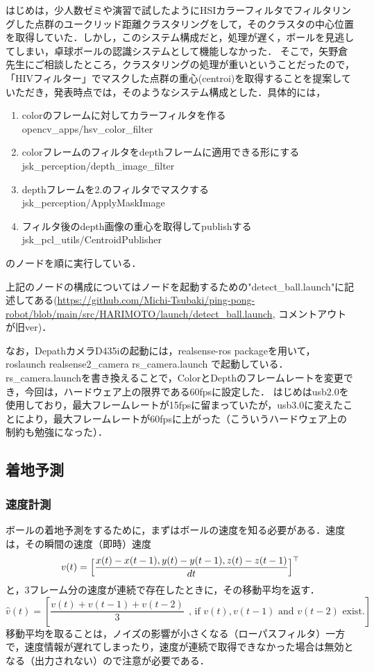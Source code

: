 \documentclass[10pt, oneside, titlepage]{ltjarticle}  %
\begin{document}
  はじめは，少人数ゼミや演習で試したようにHSIカラーフィルタでフィルタリングした点群のユークリッド距離クラスタリングをして，そのクラスタの中心位置を取得していた\cite{detect2}．しかし，このシステム構成だと，処理が遅く，ボールを見逃してしまい，卓球ボールの認識システムとして機能しなかった．
  そこで，矢野倉先生にご相談したところ，クラスタリングの処理が重いということだったので，「HIVフィルター」でマスクした点群の重心(centroi)を取得することを提案していただき\cite{detect1}，発表時点では，そのようなシステム構成とした．具体的には，
  \begin{enumerate}
  \item colorのフレームに対してカラーフィルタを作る \\
  opencv\_apps/hsv\_color\_filter
  \item colorフレームのフィルタをdepthフレームに適用できる形にする \\
  jsk\_perception/depth\_image\_filter
  \item depthフレームを2.のフィルタでマスクする \\
  jsk\_perception/ApplyMaskImage
  \item フィルタ後のdepth画像の重心を取得してpublishする \\
  jsk\_pcl\_utils/CentroidPublisher
  \end{enumerate}
  のノードを順に実行している．

  上記のノードの構成についてはノードを起動するための"detect\_ball.launch"に記述してある(\url{https://github.com/Michi-Tsubaki/ping-pong-robot/blob/main/src/HARIMOTO/launch/detect_ball.launch}, コメントアウトが旧ver)．

  なお，DepathカメラD435iの起動には，realsense-ros packageを用いて，roslaunch realsense2\_camera rs\_camera.launch で起動している．rs\_camera.launchを書き換えることで，ColorとDepthのフレームレートを変更でき，今回は，ハードウェア上の限界である60fpsに設定した．\cite{detect3}
  はじめはusb2.0を使用しており，最大フレームレートが15fpsに留まっていたが，usb3.0に変えたことにより，最大フレームレートが60fpsに上がった（こういうハードウェア上の制約も勉強になった）．
  \subsection{着地予測}
    \subsubsection{速度計測}
    ボールの着地予測をするために，まずはボールの速度を知る必要がある．速度は，その瞬間の速度（即時）速度
    \[v(t)=\Bigl[\frac{x(t)-x(t-1), y(t)-y(t-1), z(t)-z(t-1)}{dt}\Bigl]^\top\]
    と，3フレーム分の速度が連続で存在したときに，その移動平均を返す．
    \[\hat{v}(t)=[\frac{v(t)+v(t-1)+v(t-2)}{3}~~\mbox{, if } v(t) , v(t-1) \mbox{ and } v(t-2) \mbox{ exist.}]\]
    移動平均を取ることは，ノイズの影響が小さくなる（ローパスフィルタ）一方で，速度情報が遅れてしまったり，速度が連続で取得できなかった場合は無効となる（出力されない）ので注意が必要である．
\end{document}
